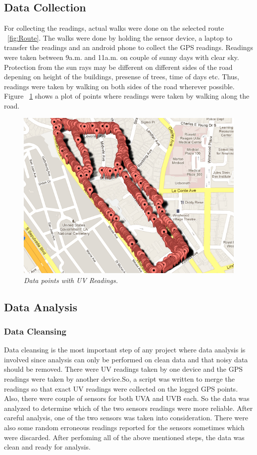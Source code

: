 \documentclass[10pt]{sigplan-proc-varsize}
\begin{document}
\subsection{Data Collection}
For collecting the readings, actual walks were done on the selected route ~\ref{fig:Route}. The walks were done by holding the sensor device, a laptop to transfer the readings and an android phone to collect the GPS readings. Readings were taken between 9a.m. and 11a.m. on couple of sunny days with clear sky. Protection from the sun rays may be different on different sides of the road depening on height of the buildings, presense of trees, time of days etc. Thus, readings were taken by walking on both sides of the road wherever possible. Figure ~\ref{fig:dataPoints} shows a plot of points where readings were taken by walking along the road.
\begin{figure}
\begin{center}
\includegraphics[scale=0.35]{dataPoints.png}
\caption{\small \sl Data points with UV Readings.\label{fig:dataPoints}}
\end{center}
\end{figure}

\subsection{Data Analysis}
\subsubsection{Data Cleansing}
Data cleansing is the most important step of any project where data analysis is involved since analysis can only be performed on clean data and that noisy data should be removed. There were UV readings taken by one device and the GPS readings were taken by another device.So, a script was written to merge the readings so that exact UV readings were collected on the logged GPS points. Also, there were couple of sensors for both UVA and UVB each. So the data was analyzed to determine which of the two sensors readings were more reliable. After careful analysis, one of the two sensors was taken into consideration. There were also some random erroneous readings reported for the sensors sometimes which were discarded. After perfoming all of the above mentioned steps, the data was clean and ready for analysis.
\end{document}
